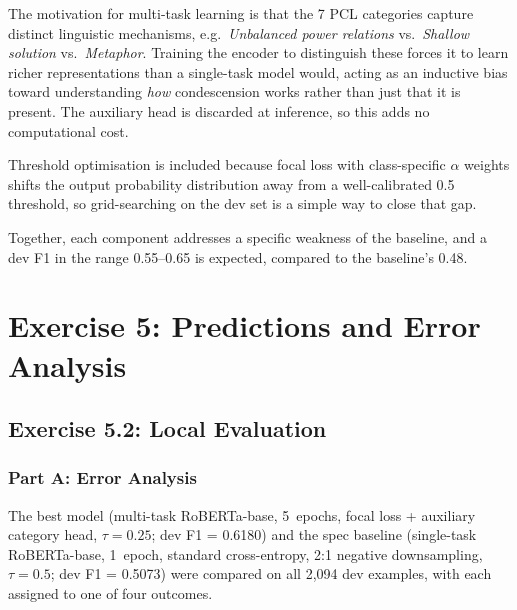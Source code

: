 \documentclass{article}
\begin{document}
The motivation for multi-task learning is that the 7 PCL categories capture distinct linguistic mechanisms, e.g.\ \textit{Unbalanced power relations} vs.\ \textit{Shallow solution} vs.\ \textit{Metaphor}. Training the encoder to distinguish these forces it to learn richer representations than a single-task model would, acting as an inductive bias toward understanding \textit{how} condescension works rather than just that it is present. The auxiliary head is discarded at inference, so this adds no computational cost.

Threshold optimisation is included because focal loss with class-specific $\alpha$ weights shifts the output probability distribution away from a well-calibrated 0.5 threshold, so grid-searching on the dev set is a simple way to close that gap.

Together, each component addresses a specific weakness of the baseline, and a dev F1 in the range 0.55--0.65 is expected, compared to the baseline's 0.48.

\section{Exercise 5: Predictions and Error Analysis}

\subsection*{Exercise 5.2: Local Evaluation}

\subsubsection*{Part A: Error Analysis}

The best model (multi-task RoBERTa-base, 5~epochs, focal loss + auxiliary category head, $\tau=0.25$; dev F1 = 0.6180) and the spec baseline (single-task RoBERTa-base, 1~epoch, standard cross-entropy, 2:1 negative downsampling, $\tau=0.5$; dev F1 = 0.5073) were compared on all 2,094 dev examples, with each assigned to one of four outcomes.
\end{document}
